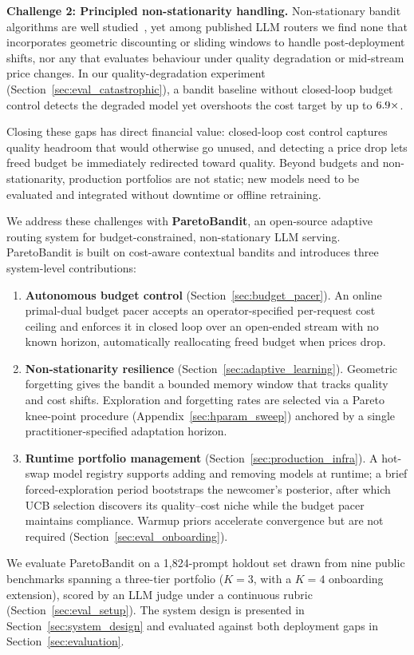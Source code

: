 \noindent\textbf{Challenge 2: Principled non-stationarity handling.}
Non-stationary bandit algorithms are well studied~\cite{garivier2011switching, russac2019weighted}, yet among published LLM routers we find none that incorporates geometric discounting or sliding windows to handle post-deployment shifts, nor any that evaluates behaviour under quality degradation or mid-stream price changes. In our quality-degradation experiment (Section~\ref{sec:eval_catastrophic}), a bandit baseline without closed-loop budget control detects the degraded model yet overshoots the cost target by up to $6.9\times$.

Closing these gaps has direct financial value: closed-loop cost control captures quality headroom that would otherwise go unused, and detecting a price drop lets freed budget be immediately redirected toward quality. Beyond budgets and non-stationarity, production portfolios are not static; new models need to be evaluated and integrated without downtime or offline retraining.

We address these challenges with \textbf{ParetoBandit}, an open-source adaptive routing system for budget-constrained, non-stationary LLM serving. ParetoBandit is built on cost-aware contextual bandits and introduces three system-level contributions:

\begin{enumerate}[nosep,leftmargin=*]
  \item \textbf{Autonomous budget control} (Section~\ref{sec:budget_pacer}). An online primal-dual budget pacer accepts an operator-specified per-request cost ceiling and enforces it in closed loop over an open-ended stream with no known horizon, automatically reallocating freed budget when prices drop.

  \item \textbf{Non-stationarity resilience} (Section~\ref{sec:adaptive_learning}). Geometric forgetting gives the bandit a bounded memory window that tracks quality and cost shifts. Exploration and forgetting rates are selected via a Pareto knee-point procedure (Appendix~\ref{sec:hparam_sweep}) anchored by a single practitioner-specified adaptation horizon.

  \item \textbf{Runtime portfolio management} (Section~\ref{sec:production_infra}). A hot-swap model registry supports adding and removing models at runtime; a brief forced-exploration period bootstraps the newcomer's posterior, after which UCB selection discovers its quality--cost niche while the budget pacer maintains compliance. Warmup priors accelerate convergence but are not required (Section~\ref{sec:eval_onboarding}).
\end{enumerate}

We evaluate ParetoBandit on a 1,824-prompt holdout set drawn from nine public benchmarks spanning a three-tier portfolio ($K{=}3$, with a $K{=}4$ onboarding extension), scored by an LLM judge under a continuous rubric (Section~\ref{sec:eval_setup}). The system design is presented in Section~\ref{sec:system_design} and evaluated against both deployment gaps in Section~\ref{sec:evaluation}.
